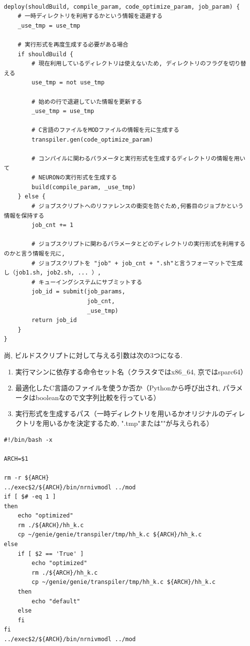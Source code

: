 {\footnotesize
\begin{lstlisting}[title=ジョブのサブミット 疑似コード, frame=single]

deploy(shouldBuild, compile_param, code_optimize_param, job_param) {
    # 一時ディレクトリを利用するかという情報を退避する
    _use_tmp = use_tmp

    # 実行形式を再度生成する必要がある場合
    if shouldBuild {
        # 現在利用しているディレクトリは使えないため, ディレクトリのフラグを切り替える
        use_tmp = not use_tmp

        # 始めの行で退避していた情報を更新する
        _use_tmp = use_tmp

        # C言語のファイルをMODファイルの情報を元に生成する
        transpiler.gen(code_optimize_param)

        # コンパイルに関わるパラメータと実行形式を生成するディレクトリの情報を用いて
        # NEURONの実行形式を生成する
        build(compile_param, _use_tmp)
    } else {
        # ジョブスクリプトへのリファレンスの衝突を防ぐため,何番目のジョブかという情報を保持する
        job_cnt += 1

        # ジョブスクリプトに関わるパラメータとどのディレクトリの実行形式を利用するのかと言う情報を元に,
        # ジョブスクリプトを "job" + job_cnt + ".sh"と言うフォーマットで生成し（job1.sh, job2.sh, ... ）,
        # キューイングシステムにサブミットする
        job_id = submit(job_params,
                        job_cnt,
                        _use_tmp)
        return job_id
    }
}
\end{lstlisting}
}

尚, ビルドスクリプトに対して与える引数は次の3つになる.\\
\begin{enumerate}
\item 実行マシンに依存する命令セット名（クラスタではx86\_64, 京ではsparc64）
\item 最適化したC言語のファイルを使うか否か（Pythonから呼び出され, パラメータはbooleanなので文字列比較を行っている）
\item 実行形式を生成するパス（一時ディレクトリを用いるかオリジナルのディレクトリを用いるかを決定するため, ".tmp"または""が与えられる）
\end{enumerate}
{\footnotesize
\begin{lstlisting}[title=実行形式のビルドスクリプト, frame=single]
#!/bin/bash -x

ARCH=$1

rm -r ${ARCH}
../exec$2/${ARCH}/bin/nrnivmodl ../mod
if [ $# -eq 1 ]
then
    echo "optimized"
    rm ./${ARCH}/hh_k.c
    cp ~/genie/genie/transpiler/tmp/hh_k.c ${ARCH}/hh_k.c
else
    if [ $2 == 'True' ]
        echo "optimized"
        rm ./${ARCH}/hh_k.c
        cp ~/genie/genie/transpiler/tmp/hh_k.c ${ARCH}/hh_k.c
    then
        echo "default"
    else
    fi
fi
../exec$2/${ARCH}/bin/nrnivmodl ../mod
\end{lstlisting}
}


